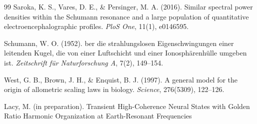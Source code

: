 \documentclass[11pt,a4paper]{article}
\begin{document}
\begin{thebibliography}{99}
Saroka, K. S., Vares, D. E., \& Persinger, M. A. (2016).
\newblock Similar spectral power densities within the Schumann resonance and a large population of quantitative electroencephalographic profiles.
\newblock \textit{PloS One}, 11(1), e0146595.

Schumann, W. O. (1952).
ber die strahlungslosen Eigenschwingungen einer leitenden Kugel, die von einer Luftschicht und einer Ionosph{\"a}renh{\"u}lle umgeben ist.
\newblock \textit{Zeitschrift f{\"u}r Naturforschung A}, 7(2), 149--154.

West, G. B., Brown, J. H., \& Enquist, B. J. (1997).
\newblock A general model for the origin of allometric scaling laws in biology.
\newblock \textit{Science}, 276(5309), 122--126.

Lacy, M. (in preparation).
\newblock Transient High-Coherence Neural States with Golden Ratio Harmonic Organization at Earth-Resonant Frequencies

\end{thebibliography}
\end{document}
